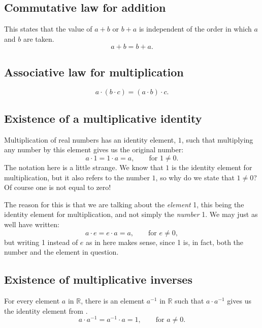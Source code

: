 \subsection{Commutative law for addition}
\label{sec:comm:add}
This states that the value of $a + b$ or $b + a$ is independent of the order
in which $a$ and $b$ are taken.\cite[pg.~14]{pinter}
\begin{equation}
    a + b = b + a.
\end{equation}

\subsection{Associative law for multiplication}
\begin{equation}
    a \cdot (b \cdot c) = (a \cdot b) \cdot c.
\end{equation}

\subsection{Existence of a multiplicative identity}
\label{sec:mult:id}
Multiplication of real numbers has an identity element, $1$,
such that multiplying any number by this element gives us the original number:
\begin{equation}
    a \cdot 1 = 1 \cdot a = a, \qquad \text{for } 1 \neq 0.
    \label{eq:mult:id}
\end{equation}
The notation here is a little strange.
We know that $1$ is the identity element for multiplication, but it also
refers to the number $1$, so why do we state that $1 \neq 0$?
Of course one is not equal to zero!

The reason for this is that we are talking about the \emph{element} 1, this
being the identity element for multiplication, and not simply the \emph{number}
1. We may just as well have written:
\begin{equation*}
    a \cdot e = e \cdot a = a, \qquad \text{for } e \neq 0,
\end{equation*}
but writing 1 instead of $e$ as in  here makes sense,
since 1 is, in fact, both the number and the element in question.

\subsection{Existence of multiplicative inverses}
For every element $a$ in $\mathbb{R}$, there is an element $a^{-1}$ in 
$\mathbb{R}$ such that $a \cdot a^{-1}$ gives us the identity element
from .
\begin{equation}
    a \cdot a^{-1} = a^{-1} \cdot a = 1, \qquad \text{for } a \neq 0.
\end{equation}


